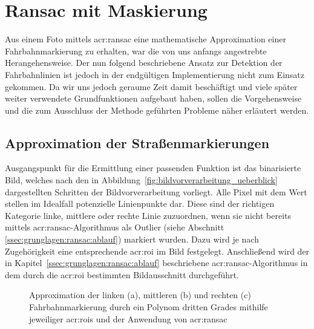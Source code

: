 \section{Ransac mit Maskierung \dcfirstauthorshort} 
\label{sec:maskenbau}

Aus einem Foto mittels \gls{acr:ransac} eine mathematische Approximation einer Fahrbahnmarkierung zu erhalten, war die von uns anfangs angestrebte Herangehensweise. Der nun folgend beschriebene Ansatz zur Detektion der Fahrbahnlinien ist jedoch in der endgültigen Implementierung nicht zum Einsatz gekommen. Da wir uns jedoch geraume Zeit damit beschäftigt und viele später weiter verwendete Grundfunktionen aufgebaut haben, sollen die Vorgehensweise und die zum Ausschluss der Methode geführten Probleme näher erläutert werden. 

\subsection{Approximation der Straßenmarkierungen}

Ausgangspunkt für die Ermittlung einer passenden Funktion ist das binarisierte Bild, welches nach den in Abbildung~\ref{fig:bildvorverarbeitung_ueberblick} dargestellten Schritten der Bildvorverarbeitung vorliegt. Alle Pixel mit dem Wert \grqq{} stellen im Idealfall potenzielle Linienpunkte dar. Diese sind der richtigen Kategorie \glqq linke\grqq , \glqq mittlere\grqq{} oder \glqq rechte\grqq{} Linie zuzuordnen, wenn sie nicht bereits mittels \gls{acr:ransac}-Algorithmus als Outlier (siehe Abschnitt \ref{ssec:grunglagen:ransac:ablauf}) markiert wurden. Dazu wird je nach Zugehörigkeit eine entsprechende \gls{acr:roi} im Bild festgelegt. Anschließend wird der in Kapitel~\ref{ssec:grunglagen:ransac:ablauf} beschriebene \gls{acr:ransac}-Algorithmus in dem durch die \gls{acr:roi} bestimmten Bildausschnitt durchgeführt.

\begin{figure}[htbp]
	\centering
	\hfill
	\hfill
	\caption{Approximation der linken (a), mittleren (b) und rechten (c) Fahrbahnmarkierung durch ein Polynom dritten Grades mithilfe jeweiliger \glspl{acr:roi} und der Anwendung von \gls{acr:ransac}}
	\label{fig:fahrspurerkennung_ransac_masken}
\end{figure} 

